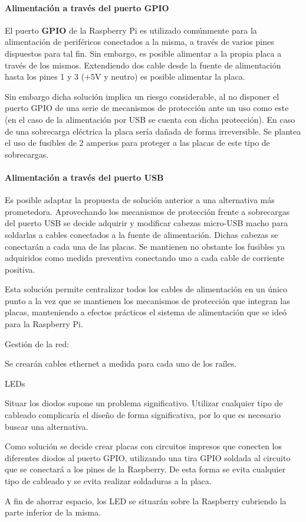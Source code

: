 \paragraph{Alimentación a través del puerto GPIO\\}

El puerto \textbf{GPIO} de la Raspberry Pi es utilizado comúnmente para la alimentación de periféricos conectados a la misma, a través de varios pines dispuestos para tal fin. Sin embargo, es posible alimentar a la propia placa a través de los mismos. Extendiendo dos cable desde la fuente de alimentación hasta los pines 1 y 3 (+5V y neutro) es posible alimentar la placa.

Sin embargo dicha solución implica un riesgo considerable, al no disponer el puerto GPIO de una serie de mecanismos de protección ante un uso como este (en el caso de la alimentación por USB se cuenta con dicha protección). En caso de una sobrecarga eléctrica la placa sería dañada de forma irreversible. Se plantea el uso de fusibles de 2 amperios para proteger a las placas de este tipo de sobrecargas.

\paragraph{Alimentación a través del puerto USB\\}

Es posible adaptar la propuesta de solución anterior a una alternativa más prometedora. Aprovechando los mecanismos de protección frente a sobrecargas del puerto USB se decide adquirir y modificar cabezas micro-USB macho para soldarlas a cables conectados a la fuente de alimentación. Dichas cabezas se conectarán a cada una de las placas. Se mantienen no obstante los fusibles ya adquiridos como medida preventiva conectando uno a cada cable de corriente positiva.

Esta solución permite centralizar todos los cables de alimentación en un único punto a la vez que se mantienen los mecanismos de protección que integran las placas, manteniendo a efectos prácticos el sistema de alimentación que se ideó para la Raspberry Pi.

Gestión de la red:

Se crearán cables ethernet a medida para cada uno de los raíles.

LEDs

Situar los diodos supone un problema significativo. Utilizar cualquier tipo de cableado complicaría el diseño de forma significativa, por lo que es necesario buscar una alternativa.

Como solución se decide crear placas con circuitos impresos que conecten los diferentes diodos al puerto GPIO, utilizando una tira GPIO soldada al circuito que se conectará a los pines de la Raspberry. De esta forma se evita cualquier tipo de cableado y se evita realizar soldaduras a la placa.

A fin de ahorrar espacio, los LED se situarán sobre la Raspberry cubriendo la parte inferior de la misma.